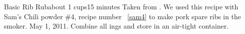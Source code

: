 \newpage
\begin{recipe}{Basic Rib Rub}{about 1 cups}{15 minutes}
\freeform Taken from \emph{}. We used this recipe with Sam's Chili powder \#4, recipe number ~\ref{sam4} to make pork spare ribs in the smoker.  May 1, 2011.
Combine all ings and store in an air-tight container.
\end{recipe}
